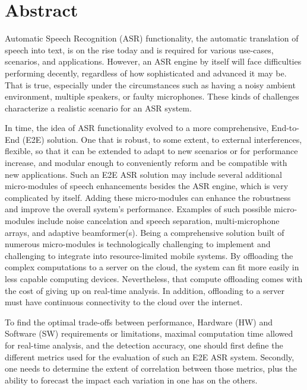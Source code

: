 \chapter*{Abstract}
\vspace*{-1cm}
Automatic Speech Recognition (ASR) functionality,
the automatic translation of
speech into text, 
is on the rise today and is required for 
various use-cases,
scenarios, and applications.
However, 
an ASR engine by itself will face difficulties 
performing decently, 
regardless of how sophisticated and advanced it may be.
That is true, 
especially under the circumstances 
such as having a noisy ambient environment,
multiple speakers, or faulty microphones.
These kinds of challenges characterize 
a realistic scenario for an ASR system.

In time, the idea of ASR functionality evolved
to a more comprehensive, End-to-End (E2E) solution.
One that is robust, to some extent, to 
external interferences, 
flexible, so that it can be extended 
to adapt to new scenarios or for performance increase,
and modular enough to 
conveniently reform and be compatible 
with new applications.
Such an E2E ASR solution may include 
several additional micro-modules 
of speech enhancements besides the ASR engine, 
which is very complicated by itself. 
Adding these micro-modules can enhance the robustness 
and improve the overall system's performance.
Examples of such possible micro-modules include 
noise cancelation and speech separation, 
multi-microphone arrays, and adaptive beamformer(s).
Being a comprehensive solution built of
numerous micro-modules is technologically 
challenging to implement
and challenging to integrate into resource-limited
mobile systems. 
By offloading the complex computations to a server
on the cloud, 
the system can fit more easily in less capable computing devices. 
Nevertheless, that compute offloading comes with the cost of
giving up on real-time analysis. 
In addition, offloading to a server must have continuous
connectivity to the cloud over the internet.

To find the optimal trade-offs between performance,
Hardware (HW) and Software (SW) 
requirements or limitations, 
maximal computation time 
allowed for real-time analysis,
and the detection accuracy,
one should first define the different metrics 
used for the evaluation 
of such an E2E ASR system.
Secondly, one needs to determine 
the extent of correlation between those 
metrics, plus the ability to forecast the
impact each variation in one has on the others.

